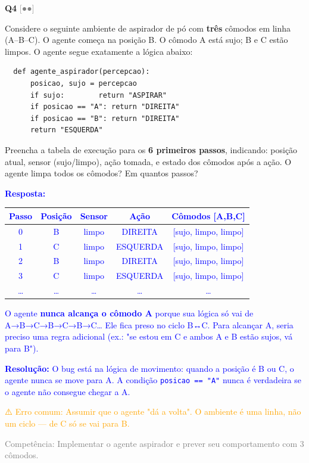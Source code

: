 \documentclass[12pt,a4paper]{article}
\newcommand{\sol}[1]{\textcolor{blue}{#1}}
\newcommand{\errocomum}[1]{\textcolor{orange}{⚠️ Erro comum: #1}}
\newcommand{\competencia}[1]{\textcolor{gray}{Competência: #1}}
\newcommand{\sol}[1]{}
\newcommand{\errocomum}[1]{}
\newcommand{\competencia}[1]{}
\newcommand{\sol}[1]{}
\newcommand{\errocomum}[1]{}
\newcommand{\competencia}[1]{}
\newcommand{\nivel}[1]{\textcolor{gray}{[#1]}}
\newenvironment{questao}[2]{
  \vspace{0.5cm}
  \noindent\textbf{Q#1} \nivel{#2} \quad
}{
  \vspace{0.2cm}
}
\begin{document}
\begin{questao}{4}{●●}
  Considere o seguinte ambiente de aspirador de pó com \textbf{três} cômodos
  em linha (A–B–C). O agente começa na posição B. O cômodo A está sujo; B e C
  estão limpos. O agente segue exatamente a lógica abaixo:

  \begin{verbatim}
  def agente_aspirador(percepcao):
      posicao, sujo = percepcao
      if sujo:        return "ASPIRAR"
      if posicao == "A": return "DIREITA"
      if posicao == "B": return "DIREITA"
      return "ESQUERDA"
  \end{verbatim}

  Preencha a tabela de execução para os \textbf{6 primeiros passos}, indicando:
  posição atual, sensor (sujo/limpo), ação tomada, e estado dos cômodos após a ação.
  O agente limpa todos os cômodos? Em quantos passos?

  \sol{
    \textbf{Resposta:}

    \begin{tabular}{c|c|c|c|c}
      Passo & Posição & Sensor & Ação & Cômodos [A,B,C] \\
      \hline
      0 & B & limpo & DIREITA & [sujo, limpo, limpo] \\
      1 & C & limpo & ESQUERDA & [sujo, limpo, limpo] \\
      2 & B & limpo & DIREITA & [sujo, limpo, limpo] \\
      3 & C & limpo & ESQUERDA & [sujo, limpo, limpo] \\
      \dots & \dots & \dots & \dots & \dots \\
    \end{tabular}

    O agente \textbf{nunca alcança o cômodo A} porque sua lógica só vai de A→B→C→B→C→B→C\ldots
    Ele fica preso no ciclo B↔C. Para alcançar A, seria preciso uma regra adicional
    (ex.: "se estou em C e ambos A e B estão sujos, vá para B").

    \textbf{Resolução:} O bug está na lógica de movimento: quando a posição é B ou C,
    o agente nunca se move para A. A condição \texttt{posicao == "A"} nunca é verdadeira
    se o agente não consegue chegar a A.

    \errocomum{Assumir que o agente "dá a volta". O ambiente é uma linha, não um ciclo —
    de C só se vai para B.}

    \competencia{Implementar o agente aspirador e prever seu comportamento
    com 3 cômodos.}
  }
\end{questao}
\end{document}
